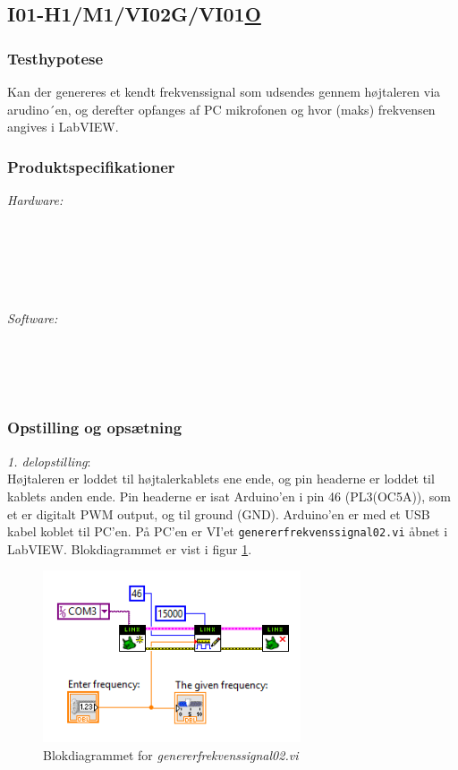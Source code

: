 	\subsection{I01-H1/M1/VI02G/VI01\underline{O}} 
	\label{bordtest1}
		\subsubsection{Testhypotese}
		Kan der genereres et kendt frekvenssignal som udsendes gennem højtaleren via arudino´en, og derefter opfanges af PC mikrofonen og hvor (maks) frekvensen angives i LabVIEW. 
		\subsubsection{Produktspecifikationer}
		
		\textit{Hardware:}\\
		\\
		\hojtalerkabel\\
		\pins\\
		\arduino\\
		\PC\\
		\usbkabel
	
		\textit{Software:}\\
		\labview\\
		\visa\\
		\vi\\
		\ardsw\
		
		\subsubsection{Opstilling og opsætning}
		\textit{1. delopstilling}:\\
		Højtaleren er loddet til højtalerkablets ene ende, og pin headerne er loddet til kablets anden ende. 
		Pin headerne er isat Arduino'en i pin 46 (PL3(OC5A)), som et er digitalt PWM output, og til ground (GND). 
		Arduino'en er med et USB kabel koblet til PC'en. 		
		På PC'en er VI'et \texttt{genererfrekvenssignal02.vi} åbnet i LabVIEW.     		Blokdiagrammet er vist i figur \ref{fig:1gf02}.\\ 
 
\begin{figure}[htb]
			\centering
				\includegraphics[width=3in]{gf02}
				\caption{Blokdiagrammet for \textit{genererfrekvenssignal02.vi}}	
				\label{fig:1gf02}
			\end{figure} 
 
